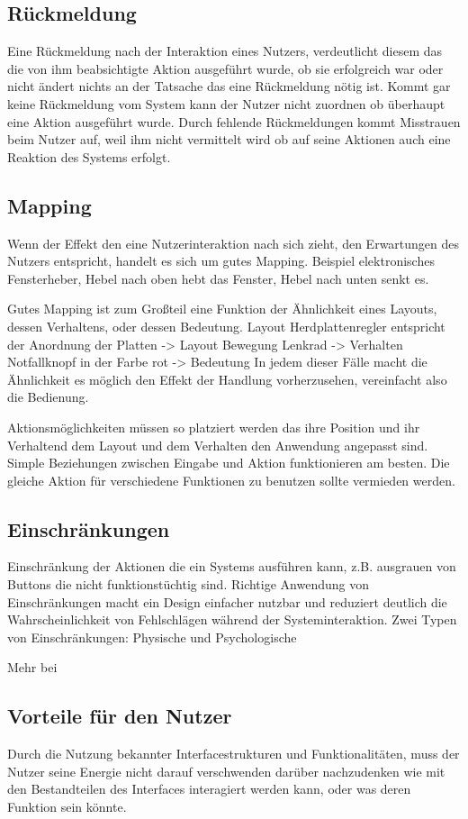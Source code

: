 \subsection{Rückmeldung}
Eine Rückmeldung nach der Interaktion eines Nutzers, verdeutlicht diesem das die von ihm beabsichtigte Aktion ausgeführt wurde, ob sie erfolgreich war oder nicht ändert nichts an der Tatsache das eine Rückmeldung nötig ist.
Kommt gar keine Rückmeldung vom System kann der Nutzer nicht zuordnen ob überhaupt eine Aktion ausgeführt wurde. Durch fehlende Rückmeldungen kommt Misstrauen beim Nutzer auf, weil ihm nicht vermittelt wird ob auf seine Aktionen auch eine Reaktion des Systems erfolgt.\cite{Knight.2019c}

\subsection{Mapping}
Wenn der Effekt den eine Nutzerinteraktion nach sich zieht, den Erwartungen des Nutzers entspricht, handelt es sich um gutes Mapping. Beispiel elektronisches Fensterheber, Hebel nach oben hebt das Fenster, Hebel nach unten senkt es.

Gutes Mapping ist zum Großteil eine Funktion der Ähnlichkeit eines Layouts, dessen Verhaltens, oder dessen Bedeutung.
Layout Herdplattenregler entspricht der Anordnung der Platten -> Layout
Bewegung Lenkrad -> Verhalten
Notfallknopf in der Farbe rot -> Bedeutung
In jedem dieser Fälle macht die Ähnlichkeit es möglich den Effekt der Handlung vorherzusehen, vereinfacht also die Bedienung.

Aktionsmöglichkeiten müssen so platziert werden das ihre Position und ihr Verhaltend dem Layout und dem Verhalten den Anwendung angepasst sind. Simple Beziehungen zwischen Eingabe und Aktion funktionieren am besten.
Die gleiche Aktion für verschiedene Funktionen zu benutzen sollte vermieden werden.
\cite{Lidwell.2010}
\subsection{Einschränkungen}
Einschränkung der Aktionen die ein Systems ausführen kann, z.B. ausgrauen von Buttons die nicht funktionstüchtig sind.
Richtige Anwendung von Einschränkungen macht ein Design einfacher nutzbar und reduziert deutlich die Wahrscheinlichkeit von Fehlschlägen während der Systeminteraktion.
Zwei Typen von Einschränkungen: Physische und Psychologische \cite{Lidwell.2010}

Mehr bei \cite{Norman.2016}
\subsection{Vorteile für den Nutzer}
Durch die Nutzung bekannter Interfacestrukturen und Funktionalitäten, muss der Nutzer seine Energie nicht darauf verschwenden darüber nachzudenken wie mit den Bestandteilen des Interfaces interagiert werden kann, oder was deren Funktion sein könnte.
\cite{Knight.2019c}

